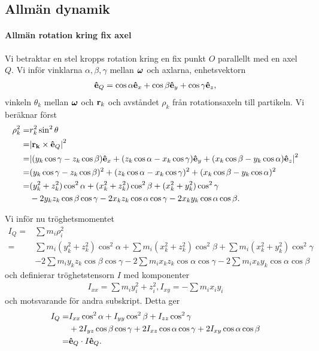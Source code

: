 \subsection{Allmän dynamik}

\paragraph{Allmän rotation kring fix axel}
Vi betraktar en stel kropps rotation kring en fix punkt $O$ parallellt med en axel $Q$. Vi inför vinklarna $\alpha, \beta, \gamma$ mellan $\vb*{\omega}$ och axlarna, enhetsvektorn
\begin{align*}
	\vu{e}_{Q} = \cos{\alpha}\vu{e}_{x} + \cos{\beta}\vu{e}_{y} + \cos{\gamma}\vu{e}_{z},
\end{align*}
vinkeln $\theta_k$ mellan $\vb*{\omega}$ och $\vb{r}_{k}$ och avståndet $\rho_{k}$ från rotationsaxeln till partikeln. Vi beräknar först
\begin{align*}
	\rho_{k}^2 =& r_{k}^2\sin^{2}{\theta} \\
	           =& \abs{\vb{r_{k}}\times\vu{e}_{Q}}^2 \\
	           =& \abs{(y_{k}\cos{\gamma} - z_{k}\cos{\beta})\vu{e}_{x} + (z_{k}\cos{\alpha} - x_{k}\cos{\gamma})\vu{e}_{y} + (x_{k}\cos{\beta} - y_{k}\cos{\alpha})\vu{e}_{z}}^2 \\
	           =& (y_{k}\cos{\gamma} - z_{k}\cos{\beta})^2 + (z_{k}\cos{\alpha} - x_{k}\cos{\gamma})^2 + (x_{k}\cos{\beta} - y_{k}\cos{\alpha})^2 \\
	           =& (y_{k}^2 + z_{k}^2)\cos^{2}{\alpha} + (x_{k}^2 + z_{k}^2)\cos^{2}{\beta} + (x_{k}^2 + y_{k}^2)\cos^{2}{\gamma} \\
	            &- 2y_{k}z_{k}\cos{\beta}\cos{\gamma} - 2x_{k}z_{k}\cos{\alpha}\cos{\gamma} - 2x_{k}y_{k}\cos{\alpha}\cos{\beta}.
\end{align*}

Vi inför nu tröghetsmomentet
\begin{align*}
	I_{Q} =& \sum m_{i}\rho_{i}^2 \\
	      =& \sum m_{i}(y_{k}^2 + z_{k}^2)\cos^{2}{\alpha} + \sum m_{i}(x_{k}^2 + z_{k}^2)\cos^{2}{\beta} + \sum m_{i}(x_{k}^2 + y_{k}^2)\cos^{2}{\gamma} \\
	       &- 2\sum m_{i}y_{k}z_{k}\cos{\beta}\cos{\gamma} - 2\sum m_{i}x_{k}z_{k}\cos{\alpha}\cos{\gamma} - 2\sum m_{i}x_{k}y_{k}\cos{\alpha}\cos{\beta}
\end{align*}
och definierar tröghetstensorn $I$ med komponenter
\begin{align*}
	I_{xx} = \sum m_{i}y_{i}^2 + z_{i}^2, I _{xy} = -\sum m_{i}x_{i}y_{i} 
\end{align*}
och motsvarande för andra subskript. Detta ger
\begin{align*}
	I_{Q} =& I_{xx}\cos^{2}{\alpha} + I_{yy}\cos^{2}{\beta} + I_{zz}\cos^{2}{\gamma} \\
	       &+ 2I_{yz}\cos{\beta}\cos{\gamma} + 2I_{xz}\cos{\alpha}\cos{\gamma} + 2I_{xy}\cos{\alpha}\cos{\beta} \\
	      =& \vu{e}_{Q}\cdot I\vu{e}_{Q}.
\end{align*}

